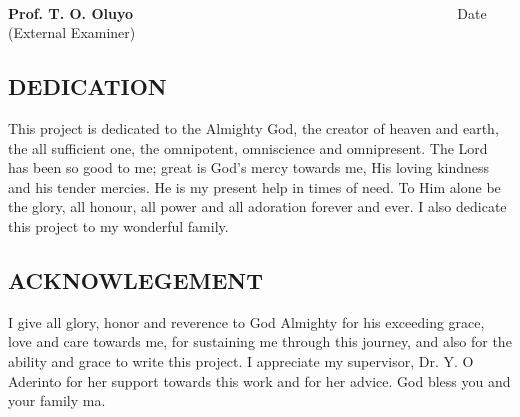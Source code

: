 \documentclass[12pt]{report}
\begin{document}
	\vspace{.99in}
	\noindent
	\dotfill			\hfill			\dotfill\\
	\textbf{Prof. T. O. Oluyo} ~~~~~~~~~~~~~~~~~~~~~~~~~~~~~~~~~~~~~~~~~~~~~ \quad
	Date\\
	(External Examiner)
	\newpage
	\begin{center}
		\section*{DEDICATION}
	\end{center}
	This project is dedicated to the Almighty God, the creator of heaven and earth, the all sufficient one, the omnipotent, omniscience and omnipresent. The Lord has been so good to me; great is God's mercy towards me, His loving kindness and his tender mercies. He is my present help in times of need. To Him alone be the glory, all honour, all power and all adoration forever and ever. I also dedicate this project to my wonderful family. %
	
	
	\newpage
	\begin{center}
		\section*{ACKNOWLEGEMENT}
	\end{center}
	I give all glory, honor and reverence to God Almighty for his exceeding grace, love and care towards me, for sustaining me through this journey, and also for the ability and grace to write this project. I appreciate my supervisor, Dr. Y. O Aderinto for her support towards this work and for her advice. God bless you and your family ma.
	
\end{document}
